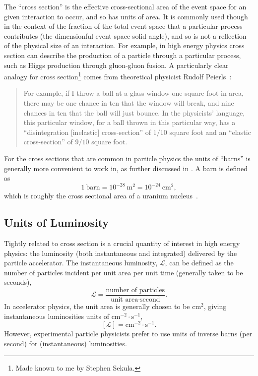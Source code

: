 The ``cross section'' is the effective cross-sectional area of the event space for an given interaction to occur, and so has units of area.
It is commonly used though in the context of the fraction of the total event space that a particular process contributes (the dimensionful event space solid angle), and so is not a reflection of the physical size of an interaction.
For example, in high energy physics cross section can describe the production of a particle through a particular process, such as Higgs production through gluon-gluon fusion.
A particularly clear analogy for cross section\footnote{Made known to me by Stephen Sekula.} comes from theoretical physicist Rudolf Peierls~\cite{rhodes2012making}:
\begin{quote}
 For example, if I throw a ball at a glass window one square foot in area, there may be one chance in ten that the window will break, and nine chances in ten that the ball will just bounce.
 In the physicists' language, this particular window, for a ball thrown in this particular way, has a ``disintegration [inelastic] cross-section'' of $1/10$ square foot and an ``elastic cross-section'' of $9/10$ square foot.
\end{quote}
For the cross sections that are common in particle physics the units of ``barns'' is generally more convenient to work in, as further discussed in .
A barn is defined as
\begin{equation}
 1~\textrm{barn} = 10^{-28}~\textrm{m}^2 = 10^{-24}~\textrm{cm}^2,
 \label{eq:barn_to_area}
\end{equation}
which is roughly the cross sectional area of a uranium nucleus~\cite{web:history_physics_purdue,history:etymology_barn}.

\subsection{Units of Luminosity}\label{subsection:luminosity_units}

Tightly related to cross section is a crucial quantity of interest in high energy physics: the luminosity (both instantaneous and integrated) delivered by the particle accelerator.
The instantaneous luminosity, $\mathscr{L}$, can be defined as the number of particles incident per unit area per unit time (generally taken to be seconds),
\begin{equation}
 \mathscr{L} = \frac{\text{number of particles}}{\text{unit area} \cdot \text{second}}.
 \label{eq:instantaneous_luminosity}
\end{equation}
In accelerator physics, the unit area is generally chosen to be $\textrm{cm}^2$, giving instantaneous luminosities units of $\textrm{cm}^{-2} \cdot \textrm{s}^{-1}$,
\[
 \left[\mathscr{L}\right] = \textrm{cm}^{-2} \cdot \textrm{s}^{-1}.
\]
However, experimental particle physicists prefer to use units of inverse barns (per second) for (instantaneous) luminosities.

